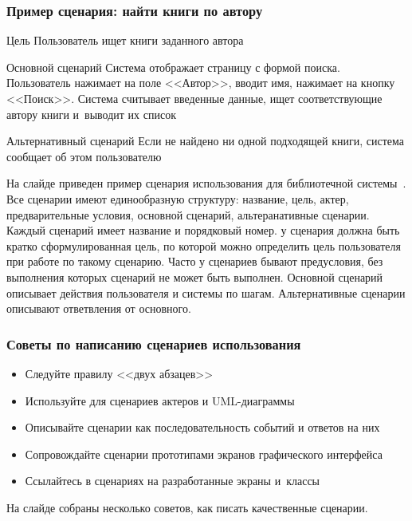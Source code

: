 \documentclass{../industrial-development}
\begin{document}
\begin{frame} \frametitle{Пример сценария: найти книги по автору}
  \begin{block}{Цель}
   Пользователь ищет книги заданного автора
  \end{block}
  \begin{block}{Основной сценарий}
   Система отображает страницу с формой поиска. Пользователь нажимает на поле <<Автор>>, вводит имя, нажимает на кнопку <<Поиск>>. Система считывает введенные данные, ищет соответствующие автору книги и~выводит их список
  \end{block}
  \begin{block}{Альтернативный сценарий}
    Если не найдено ни одной подходящей книги, система сообщает об этом пользователю
  \end{block}
\end{frame}

\lecturenotes

На слайде приведен пример сценария использования для библиотечной системы~\cite[143]{Rosenberg}. Все сценарии имеют единообразную структуру: название, цель, актер, предварительные условия, основной сценарий, альтеранативные сценарии. Каждый сценарий имеет название и порядковый номер. у сценария должна быть кратко сформулированная цель, по которой можно определить цель пользователя при работе по такому сценарию. Часто у сценариев бывают предусловия, без выполнения которых сценарий не может быть выполнен. Основной сценарий описывает действия пользователя и системы по шагам. Альтернативные сценарии описывают ответвления от основного.

\begin{frame} \frametitle{Советы по написанию сценариев использования}
 \begin{itemize}
  \item Следуйте правилу <<двух абзацев>>
  \item Используйте для сценариев актеров и UML-диаграммы
  \item Описывайте сценарии как последовательность событий и ответов на них
  \item Сопровождайте сценарии прототипами экранов графического интерфейса
  \item Ссылайтесь в сценариях на разработанные экраны и~классы
 \end{itemize}
\end{frame}

\lecturenotes

На слайде собраны несколько советов, как писать качественные сценарии.
\end{document}
